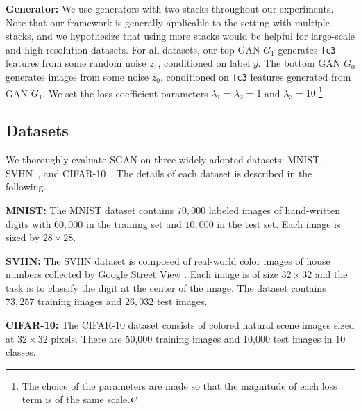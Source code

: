 \documentclass[10pt,twocolumn,letterpaper]{article}
\newcommand{\vpara}[1]{\vspace{0.1in}\noindent\textbf{#1}}
\begin{document}
\vpara{Generator:} We use generators with two stacks throughout our experiments. Note that our framework is generally applicable to the setting with multiple stacks, and we hypothesize that using more stacks would be helpful for large-scale and high-resolution datasets.  For all datasets, our top GAN $G_{1}$ generates \texttt{fc3} features from some random noise $z_{1}$, conditioned on label $y$. The bottom GAN $G_{0}$  generates images from some noise $z_{0}$, conditioned on \texttt{fc3} features generated from GAN $G_{1}$. We set the loss coefficient parameters $\lambda_1=\lambda_2=1$ and $\lambda_3=10$.\footnote{ The choice of the parameters are made so that the magnitude of each loss term is of the same scale.} %


\subsection{Datasets}
\label{datasets}

We thoroughly evaluate SGAN on three widely adopted datasets: MNIST~\cite{lecun1998gradient}, SVHN~\cite{netzer2011reading}, and CIFAR-10~\cite{krizhevsky2009learning}. The details of each dataset is described in the following. 

\vpara{MNIST:} The MNIST dataset contains $70,000$ labeled images of hand-written digits with $60,000$ in the training set and $10,000$ in the test set. Each image is sized by $28\times28$. 

\vpara{SVHN:} The SVHN dataset is composed of real-world color images of house numbers collected by Google Street View \cite{netzer2011reading}. Each image is of size $32\times32$ and the task is to classify the digit at the center of the image. %
The dataset contains $73,257$ training images and $26,032$ test images. 

\vpara{CIFAR-10:} The CIFAR-10 dataset consists of colored natural scene images sized at $32\times 32$ pixels. There are 50,000 training images and 10,000 test images in $10$ classes.  
\end{document}
